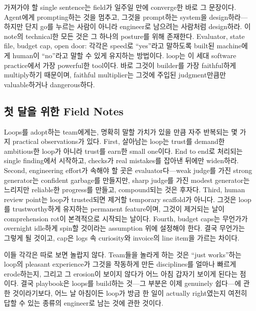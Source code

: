 \documentclass[conference]{IEEEtran}
\begin{document}
가져가야 할 single sentence는 field가 일주일 만에 converge한 바로 그 문장이다. Agent에게 prompting하는 것을 멈추고, 그것을 prompt하는 system을 design하라---하지만 단지 go를 누르는 사람이 아니라 engineer로 남으려는 사람처럼 design하라. 이 note의 technical한 모든 것은 그 하나의 posture를 위해 존재한다. Evaluator, state file, budget cap, open door: 각각은 speed로 ``yes''라고 말하도록 built된 machine에게 human이 ``no''라고 말할 수 있게 유지하는 방법이다. loop는 이 세대 software practice에서 가장 powerful한 tool이다. 바로 그것이 builder를 가장 faithful하게 multiply하기 때문이며, faithful multiplier는 그것에 주입된 judgment만큼만 valuable하거나 dangerous하다.

\subsection{첫 달을 위한 Field Notes}
Loops를 adopt하는 team에게는, 명확히 말할 가치가 있을 만큼 자주 반복되는 몇 가지 practical observations가 있다. First, 살아남는 loop는 trust를 demand한 ambitious한 loop가 아니라 trust를 earn한 small one이다. End to end로 처리되는 single finding에서 시작하고, checks가 real mistakes를 잡아낸 뒤에만 widen하라. Second, engineering effort가 속해야 할 곳은 evaluator다---weak judge를 가진 strong generator는 confident garbage를 만들지만, sharp judge를 가진 modest generator는 느리지만 reliable한 progress를 만들고, compound되는 것은 후자다. Third, human review point는 loop가 trusted되면 제거할 temporary scaffold가 아니다. 그것은 loop를 trustworthy하게 유지하는 permanent feature이며, 그것이 제거되는 날이 comprehension rot이 본격적으로 시작되는 날이다. Fourth, budget caps는 무언가가 overnight idle하게 spin할 것이라는 assumption 위에 설정해야 한다. 결국 무언가는 그렇게 될 것이고, cap은 logs 속 curiosity와 invoice의 line item을 가르는 차이다.

이들 각각은 따로 보면 놀랍지 않다. Team들을 놀라게 하는 것은 ``just works''하는 loop의 pleasant experience가 그것을 작동하게 만든 disciplines를 얼마나 빠르게 erode하는지, 그리고 그 erosion이 보이지 않다가 어느 아침 갑자기 보이게 된다는 점이다. 결국 playbook은 loops를 build하는 것---그 부분은 이제 genuinely 쉽다---에 관한 것이라기보다, 어느 날 아침이든 loop가 방금 한 일이 actually right였는지 여전히 답할 수 있는 종류의 engineer로 남는 것에 관한 것이다.
\end{document}
